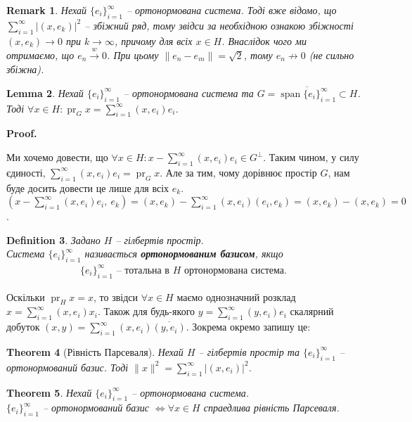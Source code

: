 \documentclass[a4paper, 10pt]{article}
\makeatletter
\theoremstyle{theoremdd}
\newtheorem{theorem}{Theorem}[subsection]
\theoremstyle{theoremdd}
\newtheorem{definition}[theorem]{Definition}
\theoremstyle{theoremdd}
\theoremstyle{theoremdd}
\theoremstyle{theoremdd}
\theoremstyle{theoremdd}
\newtheorem{remark}[theorem]{Remark}
\theoremstyle{theoremdd}
\newtheorem{lemma}[theorem]{Lemma}
\theoremstyle{theoremdd}
\newcommand{\toweak}{\overset{w}{\to}}
\DeclareMathOperator{\pr}{pr}
\renewenvironment{proof}[1][Proof.\\]{\par
\pushQED{\hfill \qed}%
\normalfont \topsep6\p@\@plus6\p@\relax
\trivlist
\item\relax
{\bfseries
#1\@addpunct{.}}\hspace\labelsep\ignorespaces
}{%
\popQED\endtrivlist\@endpefalse
}
\DeclareMathOperator{\linspan}{span}
\makeatother
\begin{document}
\begin{remark}
Нехай $\{e_i\}_{i=1}^\infty$ -- ортонормована система. Тоді вже відомо, що $\displaystyle\sum_{i=1}^\infty |(x,e_k)|^2$ -- збіжний ряд, тому звідси за необхідною ознакою збіжності $(x,e_k) \to 0$ при $k \to \infty$, причому для всіх $x \in H$. Внаслідок чого ми отримаємо, що $e_n \toweak 0$. При цьому $\|e_n - e_m\| = \sqrt{2}$, тому $e_n \not\to 0$ (не сильно збіжна).
\end{remark}

\begin{lemma}
Нехай $\{e_i\}_{i=1}^\infty$ -- ортонормована система та $G = \overline{\linspan\{e_i\}_{i=1}^\infty}\subset H$. Тоді $\forall x \in H: \pr_G x = \displaystyle\sum_{i=1}^\infty (x,e_i)e_i$.
\end{lemma}

\begin{proof}
Ми хочемо довести, що $\forall x \in H: x - \displaystyle\sum_{i=1}^\infty (x,e_i)e_i \in G^\perp$. Таким чином, у силу єдиності, $\displaystyle\sum_{i=1}^\infty (x,e_i)e_i = \pr_G x$. Але за тим, чому дорівнює простір $G$, нам буде досить довести це лише для всіх $e_k$.\\
$\displaystyle\left(x - \sum_{i=1}^\infty (x,e_i)e_i,\ e_k\right) = (x,e_k) - \sum_{i=1}^\infty (x,e_i)(e_i,e_k) = (x,e_k) - (x,e_k) = 0$.
\end{proof}

\begin{definition}
Задано $H$ -- гілбертів простір.\\
Система $\{e_i\}_{i =1}^\infty$ називається \textbf{ортонормованим базисом}, якщо
\begin{align*}
\{e_i\}_{i =1}^\infty \text{ -- тотальна в $H$ ортонормована система}.
\end{align*}
\end{definition}
\noindent
Оскільки $\pr_H x = x$, то звідси $\forall x \in H$ маємо однозначний розклад $x = \displaystyle\sum_{i=1}^\infty (x,e_i)x_i$. Також для будь-якого $y = \displaystyle\sum_{i=1}^\infty (y,e_i)e_i$ скалярний добуток $(x,y) = \displaystyle\sum_{i=1}^\infty (x,e_i)\overline{(y,e_i)}$. Зокрема окремо запишу це:

\begin{theorem}[Рівність Парсеваля]
Нехай $H$ -- гілбертів простір та $\{e_i\}_{i=1}^\infty$ -- ортонормований базис. Тоді $\|x\|^2 = \displaystyle\sum_{i=1}^\infty |(x,e_i)|^2$.
\end{theorem}

\begin{theorem}
Нехай $\{e_i\}_{i=1}^\infty$ -- ортонормована система.\\
$\{e_i\}_{i=1}^\infty$ -- ортонормований базис $\iff \forall x \in H$ спраедлива рівність Парсеваля.
\end{theorem}
\end{document}
